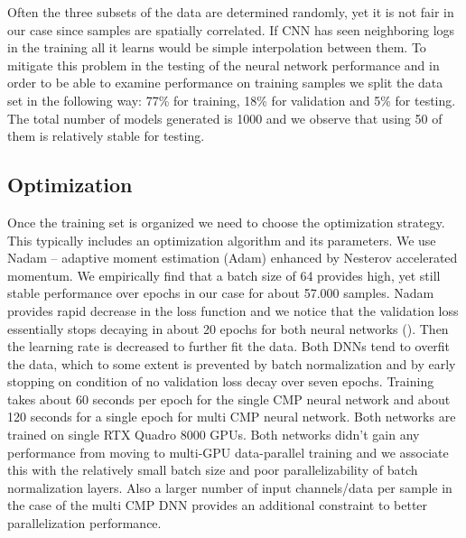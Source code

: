 \documentclass[paper,twocolomn]{geophysics}
\begin{document}
Often the three subsets of the data are determined randomly, yet it is not fair in our case since samples are spatially correlated. If CNN has seen neighboring logs in the training all it learns would be simple interpolation between them. To mitigate this problem in the testing of the neural network performance and in order to be able to examine performance on training samples we split the data set in the following way: 77\% for training, 18\% for validation and 5\% for testing. The total number of models generated is 1000 and we observe that using 50 of them is relatively stable for testing.
%



\subsection{Optimization}
Once the training set is organized we need to choose the optimization strategy. This typically includes an optimization algorithm and its parameters. We use Nadam \citep{dozat2016incorporating} -- adaptive moment estimation (Adam) enhanced by Nesterov accelerated momentum. We empirically find that a batch size of 64 provides high, yet still stable performance over epochs in our case for about 57.000 samples. Nadam provides rapid decrease in the loss function and we notice that the validation loss essentially stops decaying in about 20 epochs for both neural networks  (). Then the learning rate is decreased to further fit the data. Both DNNs tend to overfit the data, which to some extent is prevented by batch normalization and by early stopping on condition of no validation loss decay over seven epochs. Training takes about 60 seconds per epoch for the single CMP neural network and about 120 seconds for a single epoch for multi CMP neural network. Both networks are trained on single RTX Quadro 8000 GPUs. Both networks didn't gain any performance from moving to multi-GPU data-parallel training and we associate this with the relatively small batch size and poor parallelizability of batch normalization layers. Also a larger number of input channels/data per sample in the case of the multi CMP DNN provides an additional constraint to better parallelization performance.
\end{document}
